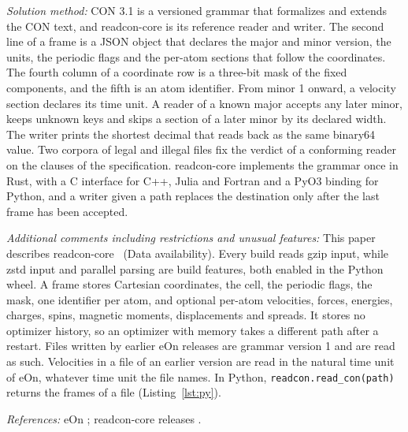 \documentclass[preprint,12pt]{elsarticle}
\begin{document}
\begin{small}
\textit{Solution method:} CON 3.1 is a versioned grammar that formalizes and extends the CON text, and readcon-core is its reference reader and writer.
The second line of a frame is a JSON object that declares the major and minor version, the units, the periodic flags and the per-atom sections that follow the coordinates.
The fourth column of a coordinate row is a three-bit mask of the fixed components, and the fifth is an atom identifier.
From minor 1 onward, a velocity section declares its time unit.
A reader of a known major accepts any later minor, keeps unknown keys and skips a section of a later minor by its declared width.
The writer prints the shortest decimal that reads back as the same binary64 value.
Two corpora of legal and illegal files fix the verdict of a conforming reader on the clauses of the specification.
readcon-core implements the grammar once in Rust, with a C interface for C++, Julia and Fortran and a PyO3 binding for Python, and a writer given a path replaces the destination only after the last frame has been accepted.

\textit{Additional comments including restrictions and unusual features:} This paper describes readcon-core~\readconCargoVersion{} (Data availability).
Every build reads gzip input, while zstd input and parallel parsing are build features, both enabled in the Python wheel.
A frame stores Cartesian coordinates, the cell, the periodic flags, the mask, one identifier per atom, and optional per-atom velocities, forces, energies, charges, spins, magnetic moments, displacements and spreads.
It stores no optimizer history, so an optimizer with memory takes a different path after a restart.
Files written by earlier eOn releases are grammar version 1 and are read as such.
Velocities in a file of an earlier version are read in the natural time unit of eOn, whatever time unit the file names.
In Python, \texttt{readcon.read\_con(path)} returns the frames of a file (Listing~\ref{lst:py}).

\textit{References:} eOn \cite{chillEonSoftwareLong2014,rohitgoswamiTheochemuieonV3602026}; readcon-core releases \cite{goswamiReadconcoreConConvel2026}.
\end{small}
\end{document}
